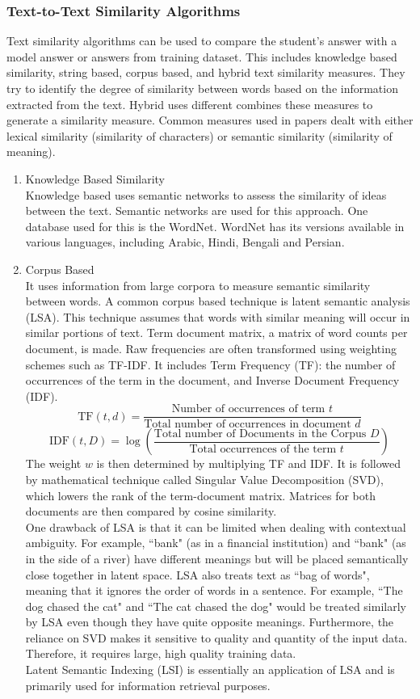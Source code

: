 \documentclass{article}
\begin{document}
	\subsubsection*{Text-to-Text Similarity Algorithms}
	Text similarity algorithms can be used to compare the student's answer with a model answer or answers from training dataset. This includes knowledge based similarity, string based, corpus based, and hybrid text similarity measures. They try to identify the degree of similarity between words based on the information extracted from the text. Hybrid uses different combines these measures to generate a similarity measure. Common measures used in papers dealt with either lexical similarity (similarity of characters) or semantic similarity (similarity of meaning).
	\begin{enumerate}
		\item Knowledge Based Similarity \\ Knowledge based uses semantic networks to assess the similarity of ideas between the text. Semantic networks are used for this approach. One database used for this is the WordNet. WordNet has its versions available in various languages, including Arabic, Hindi, Bengali and Persian. 
		\item Corpus Based \\ It uses information from large corpora to measure semantic similarity between words. A common corpus based technique is latent semantic analysis (LSA). This technique assumes that words with similar meaning will occur in similar portions of text. Term document matrix, a matrix of word counts per document, is made. Raw frequencies are often transformed using weighting schemes such as TF-IDF. It includes Term Frequency (TF): the number of occurrences of the term in the document, and Inverse Document Frequency (IDF).
		$$\text{TF}(t, d) = \frac{\text{Number of occurrences of term }t}{\text{Total number of occurrences in document }d} $$
		$$\text{IDF}(t, D) = \log \left( \frac{\text{Total number of Documents in the Corpus }D}{\text{Total occurrences of the term }t} \right) $$
		The weight $w$ is then determined by multiplying TF and IDF.
		It is followed by mathematical technique called Singular Value Decomposition (SVD), which lowers the rank of the term-document matrix. Matrices for both documents are then compared by cosine similarity. \\ One drawback of LSA is that it can be limited when dealing with contextual ambiguity. For example, ``bank" (as in a financial institution) and ``bank" (as in the side of a river) have different meanings but will be placed semantically close together in latent space. LSA also treats text as ``bag of words", meaning that it ignores the order of words in a sentence. For example, ``The dog chased the cat" and ``The cat chased the dog" would be treated similarly by LSA even though they have quite opposite meanings. Furthermore, the reliance on SVD makes it sensitive to quality and quantity of the input data. Therefore, it requires large, high quality training data. \\ Latent Semantic Indexing (LSI) is essentially an application of LSA and is primarily used for information retrieval purposes. \\ 

\end{enumerate}
\end{document}
